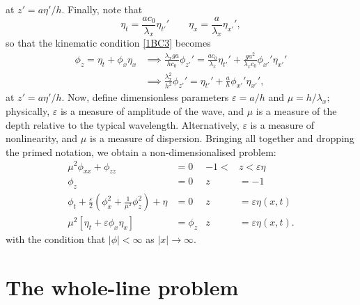 \documentclass[10pt,reqno,oneside,a4paper]{article}
\begin{document}
at $z' = a\eta'/h.$ Finally, note that 
\[ 
\eta_t = \frac{ac_0}{\lambda_x}\eta_{t'}' \qquad \eta_x = \frac{a}{\lambda_x}\eta_{x'}',
\]
so that the kinematic condition \eqref{1BC3} becomes
\begin{align*}
\phi_z = \eta_t + \phi_x\eta_x &\implies \frac{\lambda_x ga}{h c_0} \phi_{z'}'=\frac{ac_0}{\lambda_x}\eta_{t'}' + \frac{ga^2}{\lambda_xc_0} \phi_{x'}' \eta_{x'}' \\
&\implies \frac{\lambda_x^2}{h^2} \phi_{z'}'= \eta_{t'}' + \frac{a}{h} \phi_{x'}' \eta_{x'}',
\end{align*}
at $z' = a\eta'/h.$ Now, define dimensionless parameters $\varepsilon = a/h$ and $\mu = h/\lambda_x;$ physically, $\varepsilon$ is a measure of amplitude of the wave, and $\mu$ is a measure of the depth relative to the typical wavelength. Alternatively, $\varepsilon$ is a measure of nonlinearity, and $\mu$ is a measure of dispersion. Bringing all together and dropping the primed notation, we obtain a non-dimensionalised problem:
\begin{subequations}\label{WLP1DND1}
\begin{align}
\label{1PDEND1}  \mu^2 \phi_{xx} + \phi_{zz} &= 0 &-1 <&z < \varepsilon\eta \\
\label{1BC1ND1} \phi_z &= 0 &z &= -1  \\ 
\label{1BC2ND1} \phi_{t} + \frac{\varepsilon}{2} \left(\phi_{x}^2 + \frac{1}{\mu^2}\phi_{z}^2\right) + \eta &= 0 &z &= \varepsilon\eta(x,t)\\
\label{1BC3ND1} \mu^2 \left[\eta_{t} + \varepsilon \phi_{x} \eta_{x}\right] &= \phi_{z} &z &= \varepsilon\eta(x,t).
\end{align}
\end{subequations}
with the condition that $|\phi| < \infty$ as $|x|\to \infty.$

\section{The whole-line problem}
\end{document}
